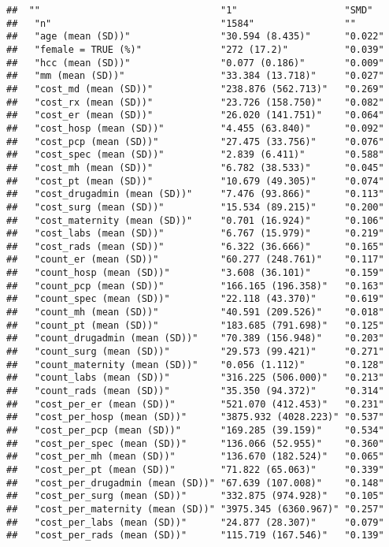 \documentclass[]{article}
\begin{document}
\begin{verbatim}
##  ""                                "1"                   "SMD"  
##   "n"                              "1584"                ""     
##   "age (mean (SD))"                "30.594 (8.435)"      "0.022"
##   "female = TRUE (%)"              "272 (17.2)"          "0.039"
##   "hcc (mean (SD))"                "0.077 (0.186)"       "0.009"
##   "mm (mean (SD))"                 "33.384 (13.718)"     "0.027"
##   "cost_md (mean (SD))"            "238.876 (562.713)"   "0.269"
##   "cost_rx (mean (SD))"            "23.726 (158.750)"    "0.082"
##   "cost_er (mean (SD))"            "26.020 (141.751)"    "0.064"
##   "cost_hosp (mean (SD))"          "4.455 (63.840)"      "0.092"
##   "cost_pcp (mean (SD))"           "27.475 (33.756)"     "0.076"
##   "cost_spec (mean (SD))"          "2.839 (6.411)"       "0.588"
##   "cost_mh (mean (SD))"            "6.782 (38.533)"      "0.045"
##   "cost_pt (mean (SD))"            "10.679 (49.305)"     "0.074"
##   "cost_drugadmin (mean (SD))"     "7.476 (93.866)"      "0.113"
##   "cost_surg (mean (SD))"          "15.534 (89.215)"     "0.200"
##   "cost_maternity (mean (SD))"     "0.701 (16.924)"      "0.106"
##   "cost_labs (mean (SD))"          "6.767 (15.979)"      "0.219"
##   "cost_rads (mean (SD))"          "6.322 (36.666)"      "0.165"
##   "count_er (mean (SD))"           "60.277 (248.761)"    "0.117"
##   "count_hosp (mean (SD))"         "3.608 (36.101)"      "0.159"
##   "count_pcp (mean (SD))"          "166.165 (196.358)"   "0.163"
##   "count_spec (mean (SD))"         "22.118 (43.370)"     "0.619"
##   "count_mh (mean (SD))"           "40.591 (209.526)"    "0.018"
##   "count_pt (mean (SD))"           "183.685 (791.698)"   "0.125"
##   "count_drugadmin (mean (SD))"    "70.389 (156.948)"    "0.203"
##   "count_surg (mean (SD))"         "29.573 (99.421)"     "0.271"
##   "count_maternity (mean (SD))"    "0.056 (1.112)"       "0.128"
##   "count_labs (mean (SD))"         "316.225 (506.000)"   "0.213"
##   "count_rads (mean (SD))"         "35.350 (94.372)"     "0.314"
##   "cost_per_er (mean (SD))"        "521.070 (412.453)"   "0.231"
##   "cost_per_hosp (mean (SD))"      "3875.932 (4028.223)" "0.537"
##   "cost_per_pcp (mean (SD))"       "169.285 (39.159)"    "0.534"
##   "cost_per_spec (mean (SD))"      "136.066 (52.955)"    "0.360"
##   "cost_per_mh (mean (SD))"        "136.670 (182.524)"   "0.065"
##   "cost_per_pt (mean (SD))"        "71.822 (65.063)"     "0.339"
##   "cost_per_drugadmin (mean (SD))" "67.639 (107.008)"    "0.148"
##   "cost_per_surg (mean (SD))"      "332.875 (974.928)"   "0.105"
##   "cost_per_maternity (mean (SD))" "3975.345 (6360.967)" "0.257"
##   "cost_per_labs (mean (SD))"      "24.877 (28.307)"     "0.079"
##   "cost_per_rads (mean (SD))"      "115.719 (167.546)"   "0.139"
\end{verbatim}
\end{document}
